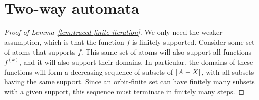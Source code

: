 \documentclass[10pt,a4paper]{amsart}
\numberwithin{equation}{section}
\theoremstyle{plain}
\newcommand{\sem}[1]{[{\kern-0.45ex}[#1]{\kern-0.45ex}]}
\begin{document}
\section{Two-way automata}  


\begin{proof}[Proof of Lemma~\ref{lem:traced-finite-iteration}]
    We only need the weaker assumption, which is that the function $f$ is finitely supported. Consider some set of atoms that supports $f$. This same set of atoms will also support all functions $f^{(k)}$, and it will also support their domains. In particular, the domains of these functions will form a decreasing sequence of subsets of $\sem{A + X}$, with all subsets having the same support. Since an orbit-finite set can have finitely many subsets with a given support, this sequence must terminate in finitely many steps.
\end{proof} 
\end{document}
